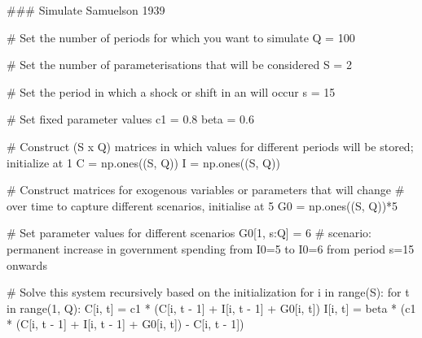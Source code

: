 \documentclass[
  letterpaper,
  DIV=11,
  numbers=noendperiod]{scrreprt}
\newenvironment{Shaded}{\begin{snugshade}}{\end{snugshade}}
\newcommand{\BuiltInTok}[1]{\textcolor[rgb]{0.00,0.23,0.31}{#1}}
\newcommand{\CommentTok}[1]{\textcolor[rgb]{0.37,0.37,0.37}{#1}}
\newcommand{\ControlFlowTok}[1]{\textcolor[rgb]{0.00,0.23,0.31}{#1}}
\newcommand{\DecValTok}[1]{\textcolor[rgb]{0.68,0.00,0.00}{#1}}
\newcommand{\FloatTok}[1]{\textcolor[rgb]{0.68,0.00,0.00}{#1}}
\newcommand{\KeywordTok}[1]{\textcolor[rgb]{0.00,0.23,0.31}{#1}}
\newcommand{\NormalTok}[1]{\textcolor[rgb]{0.00,0.23,0.31}{#1}}
\newcommand{\OperatorTok}[1]{\textcolor[rgb]{0.37,0.37,0.37}{#1}}
\begin{document}
\begin{tcolorbox}[enhanced jigsaw, titlerule=0mm, breakable, bottomrule=.15mm, toprule=.15mm, colbacktitle=quarto-callout-note-color!10!white, rightrule=.15mm, toptitle=1mm, opacityback=0, left=2mm, coltitle=black, title=\textcolor{quarto-callout-note-color}{\faInfo}\hspace{0.5em}{Python code}, colframe=quarto-callout-note-color-frame, opacitybacktitle=0.6, leftrule=.75mm, bottomtitle=1mm, arc=.35mm, colback=white]

\begin{Shaded}
\begin{Highlighting}[]
\CommentTok{\#\#\# Simulate Samuelson 1939}

\CommentTok{\# Set the number of periods for which you want to simulate}
\NormalTok{Q }\OperatorTok{=} \DecValTok{100}

\CommentTok{\# Set the number of parameterisations that will be considered}
\NormalTok{S }\OperatorTok{=} \DecValTok{2}

\CommentTok{\# Set the period in which a shock or shift in \textquotesingle{}an\textquotesingle{} will occur}
\NormalTok{s }\OperatorTok{=} \DecValTok{15}

\CommentTok{\# Set fixed parameter values}
\NormalTok{c1 }\OperatorTok{=} \FloatTok{0.8}
\NormalTok{beta }\OperatorTok{=} \FloatTok{0.6}

\CommentTok{\# Construct (S x Q) matrices in which values for different periods will be stored; initialize at 1}
\NormalTok{C }\OperatorTok{=}\NormalTok{ np.ones((S, Q))}
\NormalTok{I }\OperatorTok{=}\NormalTok{ np.ones((S, Q))}

\CommentTok{\# Construct matrices for exogenous variables or parameters that will change }
\CommentTok{\# over time to capture different scenarios, initialise at 5}
\NormalTok{G0 }\OperatorTok{=}\NormalTok{ np.ones((S, Q))}\OperatorTok{*}\DecValTok{5} 

\CommentTok{\# Set parameter values for different scenarios}
\NormalTok{G0[}\DecValTok{1}\NormalTok{, s:Q] }\OperatorTok{=} \DecValTok{6}  \CommentTok{\# scenario: permanent increase in government spending from I0=5 to I0=6 from period s=15 onwards}

\CommentTok{\# Solve this system recursively based on the initialization}
\ControlFlowTok{for}\NormalTok{ i }\KeywordTok{in} \BuiltInTok{range}\NormalTok{(S):}
    \ControlFlowTok{for}\NormalTok{ t }\KeywordTok{in} \BuiltInTok{range}\NormalTok{(}\DecValTok{1}\NormalTok{, Q):}
\NormalTok{        C[i, t] }\OperatorTok{=}\NormalTok{ c1 }\OperatorTok{*}\NormalTok{ (C[i, t }\OperatorTok{{-}} \DecValTok{1}\NormalTok{] }\OperatorTok{+}\NormalTok{ I[i, t }\OperatorTok{{-}} \DecValTok{1}\NormalTok{] }\OperatorTok{+}\NormalTok{ G0[i, t])}
\NormalTok{        I[i, t] }\OperatorTok{=}\NormalTok{ beta }\OperatorTok{*}\NormalTok{ (c1 }\OperatorTok{*}\NormalTok{ (C[i, t }\OperatorTok{{-}} \DecValTok{1}\NormalTok{] }\OperatorTok{+}\NormalTok{ I[i, t }\OperatorTok{{-}} \DecValTok{1}\NormalTok{] }\OperatorTok{+}\NormalTok{ G0[i, t]) }\OperatorTok{{-}} 
\NormalTok{                          C[i, t }\OperatorTok{{-}} \DecValTok{1}\NormalTok{])}


\end{Highlighting}
\end{Shaded}
\end{tcolorbox}
\end{document}
